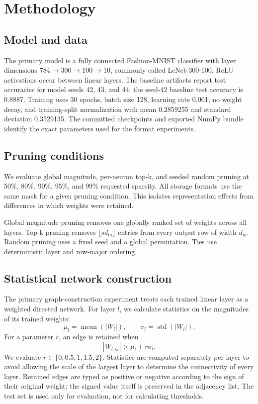 \documentclass[11pt]{article}
\begin{document}
\section{Methodology}

\subsection{Model and data}

The primary model is a fully connected Fashion-MNIST classifier with layer
dimensions $784\rightarrow300\rightarrow100\rightarrow10$, commonly called
LeNet-300-100.  ReLU activations occur between linear layers.  The baseline
artifacts report test accuracies for model seeds 42, 43, and 44; the seed-42
baseline test accuracy is 0.8887.  Training uses 30 epochs, batch size 128,
learning rate 0.001, no weight decay, and training-split normalization with
mean 0.2859255 and standard deviation 0.3529135.  The committed checkpoints
and exported NumPy bundle identify the exact parameters used for the format
experiments.

\subsection{Pruning conditions}

We evaluate global magnitude, per-neuron top-k, and seeded random pruning at
50\%, 80\%, 90\%, 95\%, and 99\% requested sparsity.  All storage formats use
the same mask for a given pruning condition.  This isolates representation
effects from differences in which weights were retained.

Global magnitude pruning removes one globally ranked set of weights across all
layers.  Top-k pruning removes
$\lfloor s d_{\mathrm{in}}\rfloor$ entries from every output row of width
$d_{\mathrm{in}}$.  Random pruning uses a fixed seed and a global permutation.
Ties use deterministic layer and row-major ordering.

\subsection{Statistical network construction}

The primary graph-construction experiment treats each trained linear layer as
a weighted directed network.  For layer $l$, we calculate statistics on the
magnitudes of its trained weights:
\[
    \mu_l = \operatorname{mean}(|W_l|), \qquad
    \sigma_l = \operatorname{std}(|W_l|).
\]
For a parameter $r$, an edge is retained when
\[
    |W_{l,ij}| > \mu_l + r\sigma_l.
\]
We evaluate $r\in\{0,0.5,1,1.5,2\}$.  Statistics are computed separately per
layer to avoid allowing the scale of the largest layer to determine the
connectivity of every layer.  Retained edges are typed as positive or negative
according to the sign of their original weight; the signed value itself is
preserved in the adjacency list.  The test set is used only for evaluation,
not for calculating thresholds.
\end{document}
